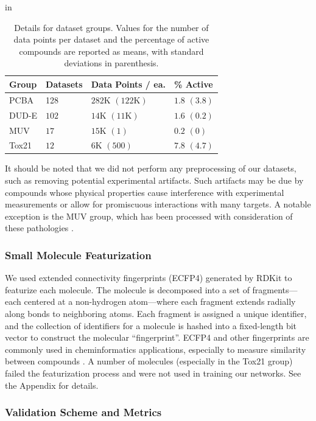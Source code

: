 \begin{table}
\small
\centering
\caption{Details for dataset groups. Values for the number of data points
per dataset and the percentage of active compounds are reported as means,
with standard deviations in parenthesis.}
 in
\label{tab:datasets}
\begin{tabular}{llll}
\toprule
{Group} & {Datasets} & {Data Points / ea.} & {\% Active} \\
\midrule
{PCBA} & 128 & $282\text{K}$ $(122\text{K})$ & $1.8$ $(3.8)$ \\
DUD-E & $102$ & $14\text{K}$ $(11\text{K})$ & $1.6$ $(0.2)$ \\
MUV & $17$ & $15\text{K}$ $(1)$ & $0.2$ $(0)$ \\
Tox21 & $12$ & $6\text{K}$ $(500)$ & $7.8$ $(4.7)$ \\
\bottomrule
\end{tabular}
\vskip -0.2in
\end{table}

It should be noted that we did not perform any preprocessing of our
datasets, such as removing potential experimental artifacts. Such artifacts
may be due by compounds whose physical properties cause interference with
experimental measurements or allow for promiscuous interactions with many
targets. A notable exception is the MUV group, which has been processed
with consideration of these pathologies \cite{rohrer2009maximum}.

\subsubsection{Small Molecule Featurization}
We used extended connectivity fingerprints (ECFP4)
\cite{rogers2010extended} generated by RDKit \cite{landrumrdkit} to
featurize each molecule. The molecule is decomposed into a set of
fragments---each centered at a non-hydrogen atom---where each fragment
extends radially along bonds to neighboring atoms. Each fragment is
assigned a unique identifier, and the collection of identifiers for a
molecule is hashed into a fixed-length bit vector to construct the
molecular ``fingerprint''.  ECFP4 and other fingerprints are commonly used
in cheminformatics applications, especially to measure similarity between
compounds \cite{willett1998chemical}. A number of molecules (especially in
the Tox21 group) failed the featurization process and were not used in
training our networks. See the Appendix for details.

\subsubsection{Validation Scheme and Metrics}

